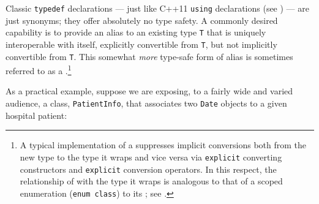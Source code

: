 Classic \lstinline!typedef! declarations --- just like C++11
\lstinline!using! declarations (see ) 
--- are just synonyms; they
offer absolutely no type safety. A commonly desired capability is to
provide an alias to an existing type \lstinline!T! that is uniquely
interoperable with itself, explicitly convertible from \lstinline!T!, but
not implicitly convertible from \lstinline!T!. This somewhat \emph{more}
type-safe form of alias is sometimes referred to as a .{\cprotect\footnote{A typical implementation of a  suppresses implicit conversions both from the new type to the type it wraps and vice versa via \lstinline!explicit! converting constructors and \lstinline!explicit! conversion operators.  In this respect, the relationship of  with the type it wraps is analogous to that of a scoped enumeration (\lstinline!enum!~\lstinline!class!)  to its ; see .}}

As a practical example, suppose we are exposing, to a fairly wide and varied audience, a class,
\lstinline!PatientInfo!, that associates two \lstinline!Date! objects to a
given hospital patient:

